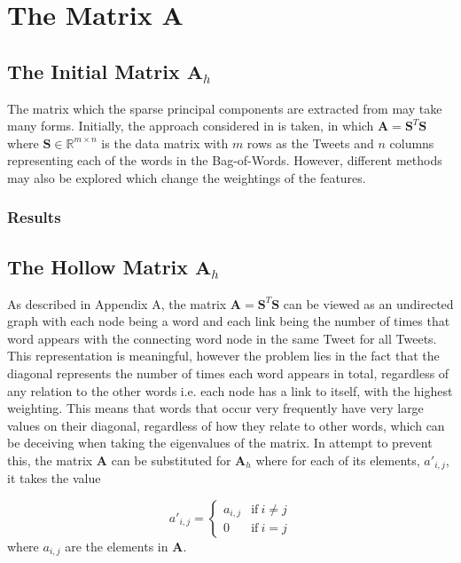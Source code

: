 \documentclass[11pt,a4paper]{article}
\begin{document}
\section{The Matrix $\mathbf{A}$}
\subsection{The Initial Matrix $\mathbf{A}_{h}$}
The matrix which the sparse principal components are extracted from may take many forms. Initially, the approach considered in \cite{dimakis} is taken, in which $\mathbf{A} = \mathbf{S}^T \mathbf{S}$ where $\mathbf{S} \in \mathbb{R}^{m \times n}$ is the data matrix with $m$ rows as the Tweets and $n$ columns representing each of the words in the Bag-of-Words. However, different methods may also be explored which change the weightings of the features.
\subsubsection{Results}

\subsection{The Hollow Matrix $\mathbf{A}_{h}$}
As described in Appendix A, the matrix $\mathbf{A} = \mathbf{S}^T \mathbf{S}$ can be viewed as an undirected graph with each node being a word and each link being the number of times that word appears with the connecting word node in the same Tweet for all Tweets. This representation is meaningful, however the problem lies in the fact that the diagonal represents the number of times each word appears in total, regardless of any relation to the other words i.e. each node has a link to itself, with the highest weighting. This means that words that occur very frequently have very large values on their diagonal, regardless of how they relate to other words, which can be deceiving when taking the eigenvalues of the matrix. In attempt to prevent this, the matrix $\mathbf{A}$ can be substituted for 
$\mathbf{A}_h$ where for each of its elements, $a'_{i, j}$, it takes the value 

\begin{equation}
a'_{i, j} = 
\begin{cases}
a_{i, j} & \text{if}\ i \neq j\\
0 & \text{if}\ i = j
\end{cases}
\end{equation}
where $a_{i, j}$ are the elements in $\mathbf{A}$.
\end{document}
